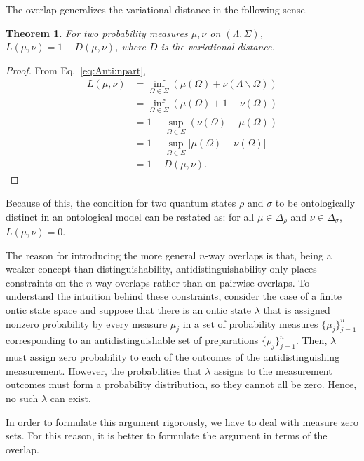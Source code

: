 \documentclass[DIV=calc,paper=a4,fontsize=11pt,twocolumn]{scrartcl} %
\theoremstyle{definition}
\theoremstyle{plain}
\newtheorem{theorem}[definition]{Theorem}
\begin{document}
The overlap generalizes the variational distance in the following
sense.

\begin{theorem}
\label{prop:Anti:varoverlap}
For two probability measures $\mu, \nu$ on $(\Lambda, \Sigma)$,
$L(\mu,\nu) = 1 - D(\mu,\nu)$, where $D$ is the variational
distance.
\end{theorem}
\begin{proof}
From Eq.~\eqref{eq:Anti:npart},
\begin{align}
L(\mu,\nu) & = \inf_{\Omega \in \Sigma} \left ( \mu(\Omega) +
\nu(\Lambda \backslash \Omega) \right ) \\
& = \inf_{\Omega \in \Sigma} \left ( \mu(\Omega) + 1 - \nu(\Omega)
\right ) \\
& = 1 - \sup_{\Omega \in \Sigma} \left ( \nu(\Omega) - \mu(\Omega)
\right ) \\
& = 1 - \sup_{\Omega \in \Sigma} \left | \mu(\Omega) - \nu(\Omega)
\right | \\
& = 1 - D(\mu,\nu).
\end{align}
\end{proof}

Because of this, the condition for two quantum states $\rho$ and
$\sigma$ to be ontologically distinct in an ontological model can be
restated as: for all $\mu \in \Delta_{\rho}$ and $\nu \in
\Delta_{\sigma}$, $L(\mu,\nu) = 0$.

The reason for introducing the more general $n$-way overlaps is that,
being a weaker concept than distinguishability, antidistinguishability
only places constraints on the $n$-way overlaps rather than on
pairwise overlaps.  To understand the intuition behind these
constraints, consider the case of a finite ontic state space and
suppose that there is an ontic state $\lambda$ that is assigned
nonzero probability by every measure $\mu_j$ in a set of probability
measures $\{\mu_j\}_{j=1}^n$ corresponding to an antidistinguishable
set of preparations $\{\rho_j\}_{j=1}^n$.  Then, $\lambda$ must assign
zero probability to each of the outcomes of the antidistinguishing
measurement.  However, the probabilities that $\lambda$ assigns to the
measurement outcomes must form a probability distribution, so they
cannot all be zero.  Hence, no such $\lambda$ can exist.

In order to formulate this argument rigorously, we have to deal with
measure zero sets.  For this reason, it is better to formulate the
argument in terms of the overlap.
\end{document}
